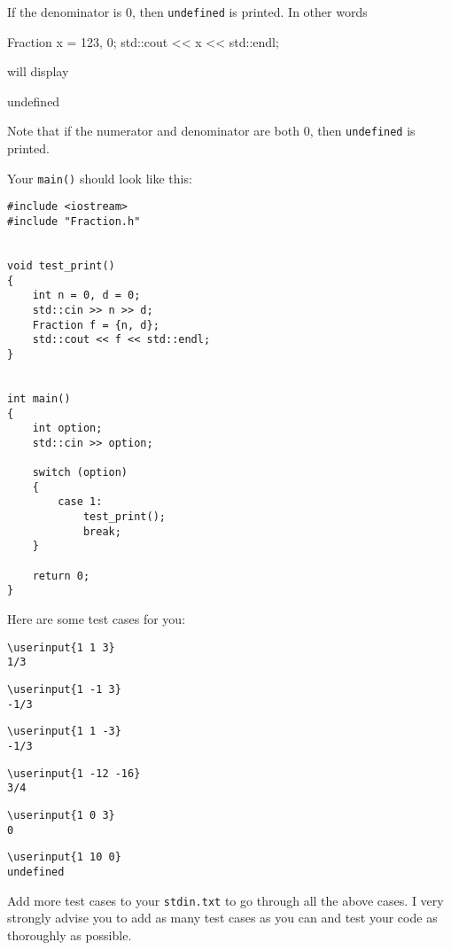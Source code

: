 If the denominator is $0$, then \verb!undefined! is printed. In other
words
\begin{console}
Fraction x = {123, 0};
std::cout << x << std::endl;
\end{console}
will display
\begin{console}
undefined
\end{console}

Note that if the numerator and denominator are both $0$, then
\verb!undefined! is printed. 

Your \verb!main()! should look like this:
{\small
\begin{Verbatim}[frame=single]
#include <iostream>
#include "Fraction.h"


void test_print()
{
    int n = 0, d = 0;
    std::cin >> n >> d;
    Fraction f = {n, d};
    std::cout << f << std::endl;
}


int main()
{
    int option;
    std::cin >> option;
    
    switch (option)
    {
        case 1:
            test_print();
            break;
    }

    return 0; 
}
\end{Verbatim}
}

Here are some test cases for you:

\resett
\nextt
\begin{Verbatim}[frame=single, commandchars=\\\{\}]
\userinput{1 1 3}
1/3
\end{Verbatim}

\nextt
\begin{Verbatim}[frame=single, commandchars=\\\{\}]
\userinput{1 -1 3}
-1/3
\end{Verbatim}

\nextt
\begin{Verbatim}[frame=single, commandchars=\\\{\}]
\userinput{1 1 -3}
-1/3
\end{Verbatim}

\nextt
\begin{Verbatim}[frame=single, commandchars=\\\{\}]
\userinput{1 -12 -16}
3/4
\end{Verbatim}

\nextt
\begin{Verbatim}[frame=single, commandchars=\\\{\}]
\userinput{1 0 3}
0
\end{Verbatim}

\nextt
\begin{Verbatim}[frame=single, commandchars=\\\{\}]
\userinput{1 10 0}
undefined
\end{Verbatim}

Add more test cases to your \verb!stdin.txt! to go through all the above cases.
I very strongly advise you to add as many test cases as you can and test your
code as thoroughly as possible.
